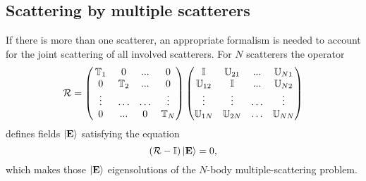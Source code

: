 \subsection{Scattering by multiple scatterers}
If there is more than one scatterer, an appropriate formalism is needed to account for the joint scattering of all involved scatterers. 
For $N$ scatterers the operator 
\begin{equation}
\mathcal{R} = 
\left(
\begin{matrix}
\mathbb{T}_1 & 0 & ... & 0 \\
0 & \mathbb{T}_2 & ... & 0 \\
\vdotswithin{\ldots} & \ldots &  \ldots & \vdotswithin{\ldots} \\
0 & ... & 0 & \mathbb{T}_N\\
\end{matrix}
\right)
\left(\begin{matrix}
\mathbb{I} & \mathbb{U}_{21} & ... & \mathbb{U}_{N 1} \\
\mathbb{U}_{12} & \mathbb{I} & ... & \mathbb{U}_{N 2} \\
\vdotswithin{\mathbb{U}_{13}} & \vdotswithin{\ldots} & \ldots & \vdotswithin{\ldots} \\
\mathbb{U}_{1 N} & \mathbb{U}_{2 N} & \ldots & \mathbb{U}_{N N} 
\end{matrix}\right)
\end{equation}
defines fields $\ket{\mathbf{E}}$ satisfying the equation
\begin{equation}
\left(\mathcal{R}-\mathbb{I}\right)\ket{\mathbf{E}} = 0,
\end{equation}
which makes those $\ket{\mathbf{E}}$ eigensolutions of the $N$-body multiple-scattering problem.